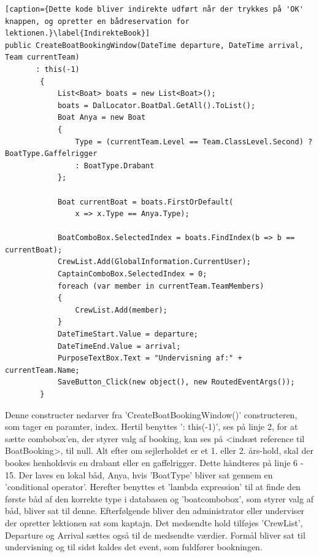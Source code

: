 \begin{lstlisting}[caption={Dette kode bliver indirekte udført når der trykkes på 'OK' knappen, og opretter en bådreservation for lektionen.}\label{IndirekteBook}]
public CreateBoatBookingWindow(DateTime departure, DateTime arrival, Team currentTeam) 
	   : this(-1)
        {
            List<Boat> boats = new List<Boat>();
            boats = DalLocator.BoatDal.GetAll().ToList();
            Boat Anya = new Boat
            {
                Type = (currentTeam.Level == Team.ClassLevel.Second) ? BoatType.Gaffelrigger 
                : BoatType.Drabant
            };

            Boat currentBoat = boats.FirstOrDefault(
                x => x.Type == Anya.Type);

            BoatComboBox.SelectedIndex = boats.FindIndex(b => b == currentBoat);
            CrewList.Add(GlobalInformation.CurrentUser);
            CaptainComboBox.SelectedIndex = 0;
            foreach (var member in currentTeam.TeamMembers)
            {
                CrewList.Add(member);
            }
            DateTimeStart.Value = departure;
            DateTimeEnd.Value = arrival;
            PurposeTextBox.Text = "Undervisning af:" + currentTeam.Name;
            SaveButton_Click(new object(), new RoutedEventArgs());
        }
\end{lstlisting}
Denne constructer nedarver fra 'CreateBoatBookingWindow()' constructeren, som tager en paramter, index. Hertil benyttes ': this(-1)', ses på linje 2, for at sætte combobox'en, der styrer valg af booking, kan ses på <indsæt reference til BoatBooking>, til null.
Alt efter om sejlerholdet er et 1. eller 2. års-hold, skal der bookes henholdsvis en drabant eller en gaffelrigger. Dette håndteres på linje 6 - 15. Der laves en lokal båd, Anya, hvis 'BoatType' bliver sat gennem en 'conditional operator'.
Herefter benyttes et 'lambda expression' til at finde den første båd af den korrekte type i databasen og 'boatcombobox', som styrer valg af båd, bliver sat til denne.
Efterfølgende bliver den administrator eller underviser der opretter lektionen sat som kaptajn. Det medsendte hold tilføjes 'CrewList', Departure og Arrival sættes også til de medsendte værdier. Formål bliver sat til undervisning og til sidst kaldes det event, som fuldfører bookningen.

